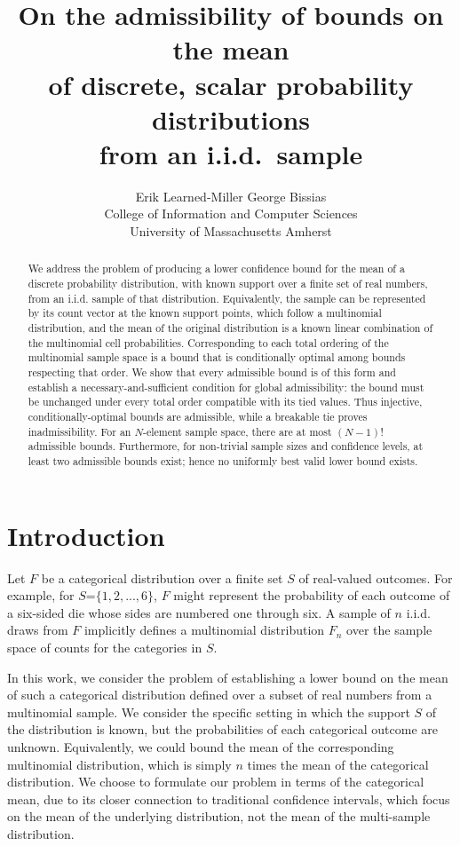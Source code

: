 \documentclass{article}
\title{On the admissibility of bounds on the mean \\of discrete, scalar probability distributions\\ from an i.i.d.~sample}
\author{
    Erik Learned-Miller \hspace{.5in} George Bissias\\
    College of Information and Computer Sciences\\
    University of Massachusetts Amherst
}
\theoremstyle{definition}
\theoremstyle{remark}
\begin{document}
\maketitle
\begin{abstract}
We address the problem of producing a lower confidence bound for the mean of a discrete probability distribution, with known support over a finite set of real numbers, from an i.i.d. sample of that  distribution. Equivalently, the sample can be represented by its count vector at the known support points, which follow a multinomial distribution, and the mean of the original distribution is a known linear combination of the multinomial cell probabilities. Corresponding to each total ordering of the multinomial sample space is a bound that is conditionally optimal among bounds respecting that order. We show that every admissible bound is of this form and establish a necessary-and-sufficient condition for global admissibility: the bound must be unchanged under every total order compatible with its tied values. Thus injective, conditionally-optimal bounds are admissible, while a breakable tie proves inadmissibility. For an $N$-element sample space, there are at most $(N-1)!$ admissible bounds. Furthermore, for non-trivial sample sizes and confidence levels, at least two admissible bounds exist; hence no uniformly best valid lower bound exists.
\color{black}
\end{abstract}
\newpage
\tableofcontents
\newpage
\section{Introduction}
Let $F$ be a categorical distribution over a finite set $S$ of real-valued outcomes. For example, for $S$=$\{1,2,...,6\}$, $F$ might represent the probability of each outcome of a six-sided die whose sides are numbered one through  six. A sample of $n$ i.i.d. draws from $F$ implicitly defines a multinomial distribution $F_n$ over the sample space of counts for the categories in $S$. 

In this work, we consider the problem of establishing a lower bound on the mean of such a categorical distribution defined over a subset of real numbers from a multinomial sample. We consider the specific setting in which the support $S$ of the distribution is known, but the probabilities of each categorical outcome are unknown. Equivalently, we could bound the mean of the corresponding multinomial distribution, which is simply $n$ times the mean of the categorical distribution. We choose to formulate our problem in terms of the categorical mean, due to its closer connection to traditional confidence intervals, which focus on the mean of the underlying distribution, not the mean of the multi-sample distribution.
\end{document}

